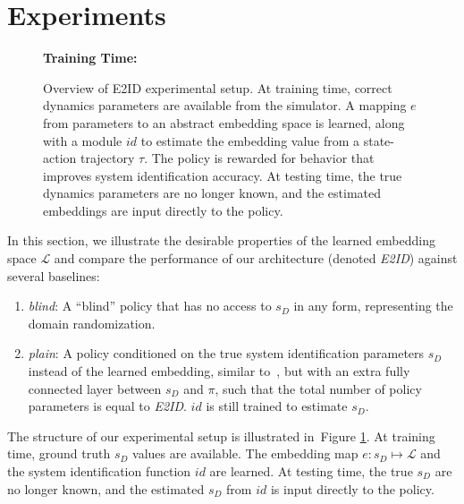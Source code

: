 \documentclass{article}
\newcommand{\TODO}[1]{\textcolor{red}{\textbf{TODO: #1}}}
\newcommand{\cL}{\mathcal{L}}
\newcommand{\cS}{\mathcal{S}}
\newcommand{\blind}{\emph{blind}}
\newcommand{\plain}{\emph{plain}}
\newcommand{\embed}{\emph{E2ID}}
\newcommand{\traj}{\emph{traj}}
\newcommand{\embedfn}{e}
\newcommand{\idfn}{id}
\newcommand{\latent}{\cL}
\newcommand{\figref}[1]{Figure \ref{#1}}
\begin{document}
\section{Experiments}

\begin{figure}[ht]
\centering
\textbf{Training Time:}

\vspace{0.4cm}

\vspace{0.4cm}
\caption{
Overview of E2ID experimental setup.
At training time, correct dynamics parameters are available from the simulator.
A mapping $\embedfn$ from parameters to an abstract embedding space is learned,
along with a module $\idfn$ to estimate the embedding value from a state-action trajectory $\tau$.
The policy is rewarded for behavior that improves system identification accuracy.
At testing time, the true dynamics parameters are no longer known,
and the estimated embeddings are input directly to the policy.
}
\label{fig:overview}
\end{figure}

In this section, we illustrate the desirable properties of the learned embedding space $\latent$
and compare the performance of our architecture (denoted \embed) against several baselines:
\begin{enumerate}
\item \blind: A ``blind'' policy that has no access to $s_D$ in any form, representing the domain randomization.
\item \plain: A policy conditioned on the true system identification parameters $s_D$ instead of the learned embedding, similar to~\citet{yu-up-osi-rss17}, but with an extra fully connected layer between $s_D$ and $\pi$, such that the total number of policy parameters is equal to \embed.
$\idfn$ is still trained to estimate $s_D$.
\end{enumerate}
The structure of our experimental setup is illustrated in~\figref{fig:overview}.
At training time, ground truth $s_D$ values are available.
The embedding map $\embedfn : s_D \mapsto \latent$ 
and the system identification function $\idfn$ are learned.
At testing time, the true $s_D$ are no longer known,
and the estimated $s_D$ from $\idfn$ is input directly to the policy.
\end{document}
